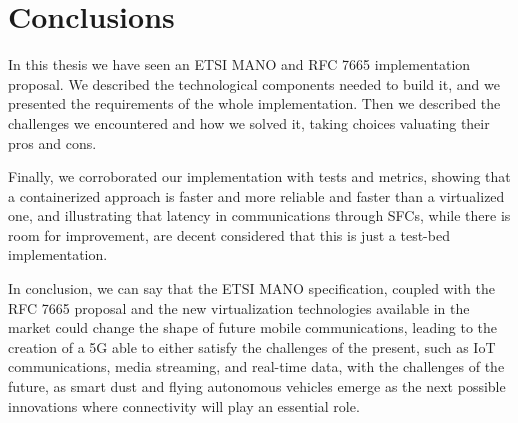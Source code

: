 \chapter{Conclusions}
\label{chap:conclusions}

In this thesis we have seen an ETSI MANO and RFC 7665 implementation proposal. 
We described the technological components needed to build it, and we presented 
the requirements of the whole implementation. Then we described the challenges 
we encountered and how we solved it, taking choices valuating their pros and 
cons.

Finally, we corroborated our implementation with tests and metrics, showing 
that a containerized approach is faster and more reliable and faster than a 
virtualized one, and illustrating that latency in communications through SFCs, 
while there is room for improvement, are decent considered that this is just 
a test-bed implementation.

In conclusion, we can say that the ETSI MANO specification, coupled with the 
RFC 7665 proposal and the new virtualization technologies available in the 
market could change the shape of future mobile communications, leading to the 
creation of a 5G able to either satisfy the challenges of the present, such as 
IoT communications, media streaming, and real-time data, with the challenges of 
the future, as smart dust and flying autonomous vehicles emerge as the next 
possible innovations where connectivity will play an essential role.
